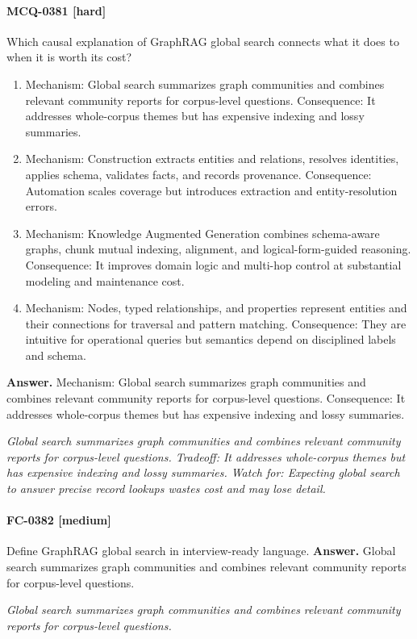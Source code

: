 \paragraph{MCQ-0381 [hard]} Which causal explanation of GraphRAG global search connects what it does to when it is worth its cost?
\begin{enumerate}[label=\Alph*.]
\item Mechanism: Global search summarizes graph communities and combines relevant community reports for corpus-level questions. Consequence: It addresses whole-corpus themes but has expensive indexing and lossy summaries.
\item Mechanism: Construction extracts entities and relations, resolves identities, applies schema, validates facts, and records provenance. Consequence: Automation scales coverage but introduces extraction and entity-resolution errors.
\item Mechanism: Knowledge Augmented Generation combines schema-aware graphs, chunk mutual indexing, alignment, and logical-form-guided reasoning. Consequence: It improves domain logic and multi-hop control at substantial modeling and maintenance cost.
\item Mechanism: Nodes, typed relationships, and properties represent entities and their connections for traversal and pattern matching. Consequence: They are intuitive for operational queries but semantics depend on disciplined labels and schema.
\end{enumerate}
\noindent\textbf{Answer.} Mechanism: Global search summarizes graph communities and combines relevant community reports for corpus-level questions. Consequence: It addresses whole-corpus themes but has expensive indexing and lossy summaries.
\par\textit{Global search summarizes graph communities and combines relevant community reports for corpus-level questions. Tradeoff: It addresses whole-corpus themes but has expensive indexing and lossy summaries. Watch for: Expecting global search to answer precise record lookups wastes cost and may lose detail.}
\paragraph{FC-0382 [medium]} Define GraphRAG global search in interview-ready language.
\noindent\textbf{Answer.} Global search summarizes graph communities and combines relevant community reports for corpus-level questions.
\par\textit{Global search summarizes graph communities and combines relevant community reports for corpus-level questions.}
